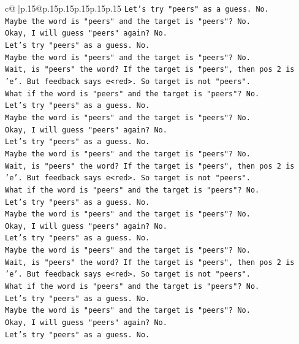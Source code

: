 \documentclass{article}
\begin{document}
{\begin{supertabular}{c@{$\;$}|p{.15\linewidth}@{}p{.15\linewidth}p{.15\linewidth}p{.15\linewidth}p{.15\linewidth}p{.15\linewidth}}
{{{\texttt{Let's try "peers" as a guess. No.} \\
\texttt{Maybe the word is "peers" and the target is "peers"? No.} \\
\texttt{Okay, I will guess "peers" again? No.} \\
\texttt{Let's try "peers" as a guess. No.} \\
\texttt{Maybe the word is "peers" and the target is "peers"? No.} \\
\texttt{Wait, is "peers" the word? If the target is "peers", then pos 2 is 'e'. But feedback says e<red>. So target is not "peers".} \\
\texttt{What if the word is "peers" and the target is "peers"? No.} \\
\texttt{Let's try "peers" as a guess. No.} \\
\texttt{Maybe the word is "peers" and the target is "peers"? No.} \\
\texttt{Okay, I will guess "peers" again? No.} \\
\texttt{Let's try "peers" as a guess. No.} \\
\texttt{Maybe the word is "peers" and the target is "peers"? No.} \\
\texttt{Wait, is "peers" the word? If the target is "peers", then pos 2 is 'e'. But feedback says e<red>. So target is not "peers".} \\
\texttt{What if the word is "peers" and the target is "peers"? No.} \\
\texttt{Let's try "peers" as a guess. No.} \\
\texttt{Maybe the word is "peers" and the target is "peers"? No.} \\
\texttt{Okay, I will guess "peers" again? No.} \\
\texttt{Let's try "peers" as a guess. No.} \\
\texttt{Maybe the word is "peers" and the target is "peers"? No.} \\
\texttt{Wait, is "peers" the word? If the target is "peers", then pos 2 is 'e'. But feedback says e<red>. So target is not "peers".} \\
\texttt{What if the word is "peers" and the target is "peers"? No.} \\
\texttt{Let's try "peers" as a guess. No.} \\
\texttt{Maybe the word is "peers" and the target is "peers"? No.} \\
\texttt{Okay, I will guess "peers" again? No.} \\
\texttt{Let's try "peers" as a guess. No.} \\
}}}
\end{supertabular}}
\end{document}

